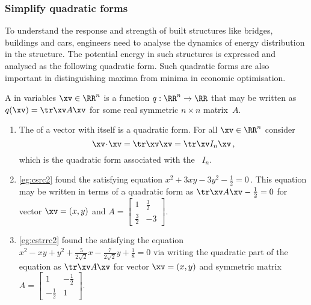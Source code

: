 \begin{comment}
Should include classification of 3D surfaces, but write later. 
Further motivate the following quadratic forms by mentioning some more applications.
\end{comment}






\subsubsection{Simplify quadratic forms}


To understand the response and strength of built structures like bridges, buildings and cars, engineers need to analyse the dynamics of energy distribution in the structure.
The potential energy in such structures is expressed and analysed as the following quadratic form.
Such quadratic forms are also important in distinguishing maxima from minima in economic optimisation.

\begin{definition} \label{def:qufo}
A  in variables \(\xv\in\RR^n\) is a function \(q:\RR^n\to\RR\) that may be written as \(q(\xv)=\tr\xv A\xv\) for some real symmetric \(n\times n\) matrix~\(A\).
\end{definition}

\begin{example} \label{eg:}
\begin{enumerate}
\item The  of a vector with itself is a quadratic form.
For all \(\xv\in\RR^n\) consider
\begin{equation*}
\xv\cdot\xv=\tr\xv\xv=\tr\xv I_n\xv\,,
\end{equation*}
which is the quadratic form associated with the ~\(I_n\).

\item \autoref{eg:csrc2} found the  satisfying equation \(x^2+3xy-3y^2-\tfrac12=0\)\,.
This equation may be written in terms of a quadratic form as \(\tr\xv A\xv-\tfrac12=0\) for vector \(\xv=(x,y)\) and  \(A=\begin{bmatrix} 1&\tfrac32\\\tfrac32&-3 \end{bmatrix}\).

\item \autoref{eg:cstrrc2} found the  satisfying the equation
\(x^2-xy+y^2+\tfrac5{2\sqrt2}x-\tfrac7{2\sqrt2}y+\tfrac18=0\) via writing the quadratic part of the equation as \(\tr\xv A\xv\) for vector \(\xv=(x,y)\) and symmetric matrix \(A=\begin{bmatrix} 1&-\tfrac12\\-\tfrac12&1 \end{bmatrix}\).
\end{enumerate}
\end{example}


